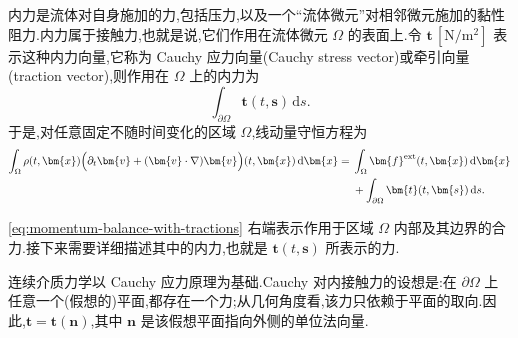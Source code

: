 \begin{note}\label{note:internal-forces-stress}
内力是流体对自身施加的力,包括压力,以及一个“流体微元”对相邻微元施加的黏性阻力.内力属于接触力,也就是说,它们作用在流体微元 $\Omega$ 的表面上.令 $\bm{t}\,[\mathrm{N}/\mathrm{m}^2]$ 表示这种内力向量,它称为 Cauchy 应力向量(Cauchy stress vector)或牵引向量(traction vector),则作用在 $\Omega$ 上的内力为
\begin{equation*}
  \int_{\partial\Omega}\bm{t}(t,\bm{s})\,\mathrm{d}s.
\end{equation*}
于是,对任意固定不随时间变化的区域 $\Omega$,线动量守恒方程为
\begin{equation}\label{eq:momentum-balance-with-tractions}
\begin{aligned}
  \int_{\Omega}\rho(t,\bm{x})
    \Bigl(\partial_t\bm{v}+(\bm{v}\cdot\nabla)\bm{v}\Bigr)(t,\bm{x})\,\mathrm{d}\bm{x}
  ={}&\int_{\Omega}\bm{f}^{\mathrm{ext}}(t,\bm{x})\,\mathrm{d}\bm{x}\\
    &+\int_{\partial\Omega}\bm{t}(t,\bm{s})\,\mathrm{d}s.
\end{aligned}
\end{equation}

\cref{eq:momentum-balance-with-tractions} 右端表示作用于区域 $\Omega$ 内部及其边界的合力.接下来需要详细描述其中的内力,也就是 $\bm{t}(t,\bm{s})$ 所表示的力.

连续介质力学以 Cauchy 应力原理为基础.Cauchy 对内接触力的设想是:在 $\partial\Omega$ 上任意一个(假想的)平面,都存在一个力;从几何角度看,该力只依赖于平面的取向.因此,$\bm{t}=\bm{t}(\bm{n})$,其中 $\bm{n}$ 是该假想平面指向外侧的单位法向量.


\end{note}
